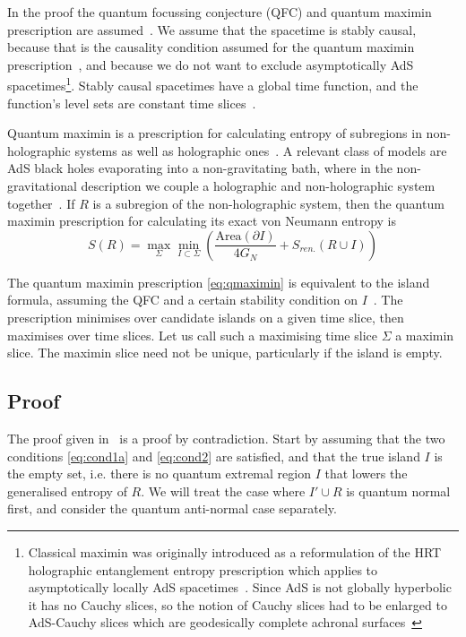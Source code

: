 \documentclass[a4paper,11pt]{article}
\newcommand{\cts}[1]{\ignorespaces}
\def\bne{\begin{equation}}
\def\ene{\end{equation}}
\newcommand{\del}{\partial}
\begin{document}
In the proof the quantum focussing conjecture (QFC) and quantum maximin prescription are assumed~\cite{Bousso2015, Akers2019}. We assume that the spacetime is stably causal, because that is the causality condition assumed for the quantum maximin prescription~\cite{Akers2019}, and because we do not want to exclude asymptotically AdS spacetimes\footnote{Classical maximin was originally introduced as a reformulation of the HRT holographic entanglement entropy prescription which applies to asymptotically locally AdS spacetimes~\cite{Hubeny2007, Wall2012}. Since AdS is not globally hyperbolic it has no Cauchy slices, so the notion of Cauchy slices had to be enlarged to AdS-Cauchy slices which are geodesically complete achronal surfaces~\cite{Wall2012, Engelhardt2014}}. Stably causal spacetimes have a global time function, and the function's level sets are constant time slices~\cite{Wald:1984rg}. 

Quantum maximin is a prescription for calculating entropy of subregions in non-holographic systems as well as holographic ones~\cite{Akers2019}. A relevant class of models are AdS black holes evaporating into a non-gravitating bath, where in the non-gravitational description we couple a holographic and non-holographic system together~\cite{Almheiri2019a}. If $R$ is a subregion of the non-holographic system, then the quantum maximin prescription for calculating its exact von Neumann entropy is
\bne \label{eq:qmaximin} S(R) = \max_\Sigma \min_{I\subset \Sigma} \left ( \frac{\text{Area}(\del I)}{4G_N} + S_{ren.}(R \cup I) \right )  \ene 

The quantum maximin prescription \eqref{eq:qmaximin} is equivalent to the island formula, assuming the QFC and a certain stability condition on $I$~\cite{Akers2019}. The prescription minimises over candidate islands on a given time slice, then maximises over time slices. Let us call such a maximising time slice $\Sigma$ a maximin slice. The maximin slice need not be unique, particularly if the island is empty.

\subsection{Proof}

The proof given in~\cite{Bousso2021} is a proof by contradiction. Start by assuming that the two conditions \eqref{eq:cond1a} and \eqref{eq:cond2} are satisfied, and that the true island $I$ is the empty set, i.e. there is no quantum extremal region $I$ that lowers the generalised entropy of $R$.  We will treat the case where $I' \cup R$ is quantum normal first, and consider the quantum anti-normal case separately. 
\end{document}
